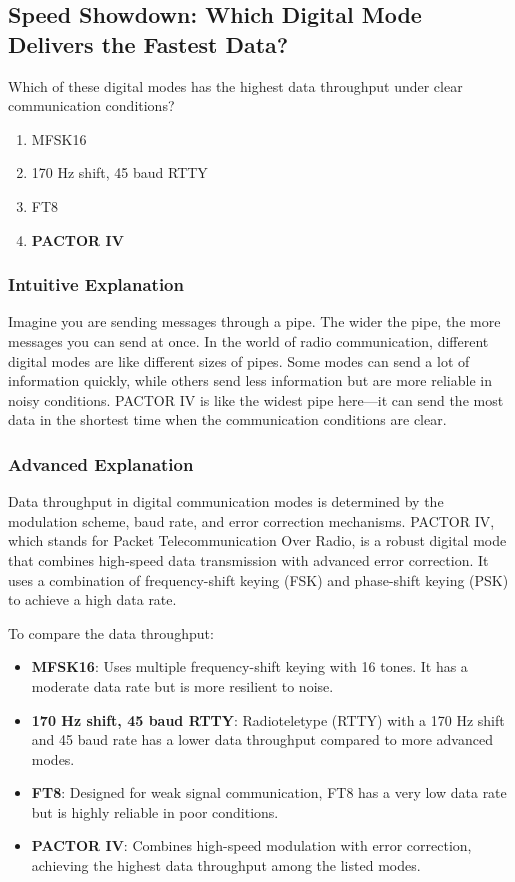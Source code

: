 \subsection{Speed Showdown: Which Digital Mode Delivers the Fastest Data?}

\begin{tcolorbox}[colback=gray!10!white,colframe=black!75!black,title=E2E13] Which of these digital modes has the highest data throughput under clear communication conditions?
    \begin{enumerate}[label=\Alph*.]
        \item MFSK16
        \item 170 Hz shift, 45 baud RTTY
        \item FT8
        \item \textbf{PACTOR IV}
    \end{enumerate}
\end{tcolorbox}

\subsubsection{Intuitive Explanation}
Imagine you are sending messages through a pipe. The wider the pipe, the more messages you can send at once. In the world of radio communication, different digital modes are like different sizes of pipes. Some modes can send a lot of information quickly, while others send less information but are more reliable in noisy conditions. PACTOR IV is like the widest pipe here—it can send the most data in the shortest time when the communication conditions are clear.

\subsubsection{Advanced Explanation}
Data throughput in digital communication modes is determined by the modulation scheme, baud rate, and error correction mechanisms. PACTOR IV, which stands for Packet Telecommunication Over Radio, is a robust digital mode that combines high-speed data transmission with advanced error correction. It uses a combination of frequency-shift keying (FSK) and phase-shift keying (PSK) to achieve a high data rate. 

To compare the data throughput:
\begin{itemize}
    \item \textbf{MFSK16}: Uses multiple frequency-shift keying with 16 tones. It has a moderate data rate but is more resilient to noise.
    \item \textbf{170 Hz shift, 45 baud RTTY}: Radioteletype (RTTY) with a 170 Hz shift and 45 baud rate has a lower data throughput compared to more advanced modes.
    \item \textbf{FT8}: Designed for weak signal communication, FT8 has a very low data rate but is highly reliable in poor conditions.
    \item \textbf{PACTOR IV}: Combines high-speed modulation with error correction, achieving the highest data throughput among the listed modes.
\end{itemize}

